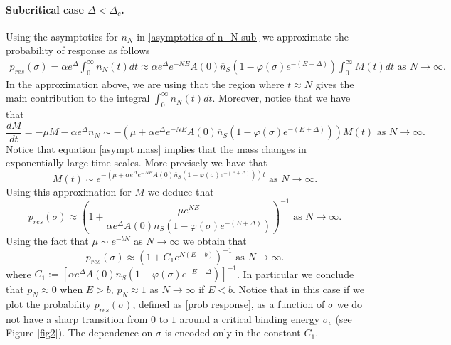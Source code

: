\documentclass{article}
\numberwithin{equation}{section}
\theoremstyle{plain}
\begin{document}
\paragraph{Subcritical case $\Delta < \Delta_c$.}
Using the asymptotics for $n_{N} $ in \eqref{asymptotics of n_N sub} we approximate the probability of response as follows 
\begin{align*} 
p_{res} (\sigma) = \alpha e^\Delta \int_0^\infty n_{N} (t) dt \approx \alpha e^{\Delta} e^{-NE} A(0) \overline n_S \left(1- \varphi(\sigma) e^{-(E+ \Delta )} \right) \int_0^\infty M (t) dt \text{ as } N \to \infty. 
\end{align*} 
In the approximation above, we are using that the region where $t \approx N $ gives the main contribution to the integral $\int_0^\infty n_N(t) dt $.
Moreover, notice that we  have that 
\begin{equation} \label{asympt mass}
\frac{dM }{dt} = - \mu M - \alpha e^{\Delta } n_{N} \sim - \left( \mu + \alpha e^{\Delta} e^{-NE} A(0) \overline n_S \left(1- \varphi(\sigma) e^{-(E+ \Delta )} \right) \right) M (t) \text{ as } N \to \infty. 
\end{equation}
Notice that equation \eqref{asympt mass} implies that the mass changes in exponentially large time scales.
More precisely we have that 
\begin{equation} \label{consistency}
M(t) \sim e^{-  \left( \mu + \alpha e^{\Delta} e^{-NE} A(0) \overline n_S \left(1- \varphi(\sigma) e^{-(E+ \Delta )} \right) \right) t } \text{ as } N \to \infty. 
\end{equation}
Using this approximation for $M $ we deduce that 
\begin{equation} \label{formal p res sub}
p_{res} (\sigma)  \approx \left(  1 +\frac{\mu e^{NE}}{ \alpha e^{\Delta} A(0) \overline n_S \left(1- \varphi(\sigma) e^{-(E+ \Delta )} \right) } \right)^{-1} \text{ as } N \to \infty. 
\end{equation}
Using the fact that $\mu \sim e^{- b N } $ as $N \to \infty $ we obtain that 
\[
p_{res}(\sigma)  \approx \left(  1 + C_1e^{N(E- b)} \right)^{-1} \text{ as } N \to \infty. 
\]
where $C_1:=\left[ \alpha e^{\Delta} A(0) \overline n_S \left(1- \varphi(\sigma) e^{-E- \Delta} \right) \right]^{-1}$. 
In particular we conclude that $p_N \approx 0 $ when $E>b $, $p_N \approx 1 $ as $N \to \infty $ if $E< b $. 
Notice that in this case if we plot the probability $p_{res} (\sigma) $, defined as \eqref{prob response}, as a function of $\sigma $ we do not have a sharp transition from $0 $ to $1 $ around a critical binding energy $\sigma_c$ (see Figure \ref{fig2}). The dependence on $\sigma $ is encoded only in the constant $C_1$.
\end{document}
